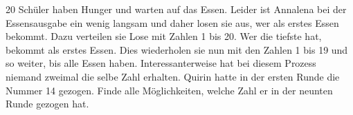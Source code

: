 20 Schüler haben Hunger und warten auf das Essen. Leider ist Annalena bei der Essensausgabe ein wenig langsam und daher losen sie aus, wer als erstes Essen bekommt. Dazu verteilen sie Lose mit Zahlen 1 bis 20. Wer die tiefste hat, bekommt als erstes Essen. Dies wiederholen sie nun mit den Zahlen 1 bis 19 und so weiter, bis alle Essen haben. Interessanterweise hat bei diesem Prozess niemand zweimal die selbe Zahl erhalten. Quirin hatte in der ersten Runde die Nummer 14 gezogen. Finde alle Möglichkeiten, welche Zahl er in der neunten Runde gezogen hat.